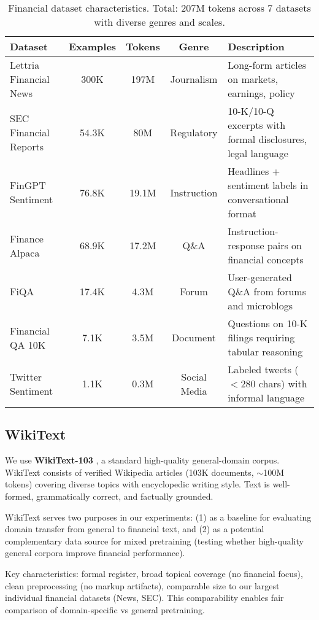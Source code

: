 \begin{table}[h]
\centering
\caption{Financial dataset characteristics. Total: 207M tokens across 7 datasets with diverse genres and scales.}
\label{tab:financial_datasets}
\small
\begin{tabular}{p{3cm}cccp{5.5cm}}
\toprule
\textbf{Dataset} & \textbf{Examples} & \textbf{Tokens} & \textbf{Genre} & \textbf{Description} \\
\midrule
Lettria Financial News & 300K & 197M & Journalism & Long-form articles on markets, earnings, policy \\
\midrule
SEC Financial Reports & 54.3K & 80M & Regulatory & 10-K/10-Q excerpts with formal disclosures, legal language \\
\midrule
FinGPT Sentiment & 76.8K & 19.1M & Instruction & Headlines + sentiment labels in conversational format \\
\midrule
Finance Alpaca & 68.9K & 17.2M & Q\&A & Instruction-response pairs on financial concepts \\
\midrule
FiQA & 17.4K & 4.3M & Forum & User-generated Q\&A from forums and microblogs \\
\midrule
Financial QA 10K & 7.1K & 3.5M & Document & Questions on 10-K filings requiring tabular reasoning \\
\midrule
Twitter Sentiment & 1.1K & 0.3M & Social Media & Labeled tweets ($<$280 chars) with informal language \\
\bottomrule
\end{tabular}
\end{table}

\subsection{WikiText}

We use \textbf{WikiText-103} \parencite{merity2016pointer}, a standard high-quality general-domain corpus. WikiText consists of verified Wikipedia articles (103K documents, $\sim$100M tokens) covering diverse topics with encyclopedic writing style. Text is well-formed, grammatically correct, and factually grounded.

WikiText serves two purposes in our experiments: (1) as a baseline for evaluating domain transfer from general to financial text, and (2) as a potential complementary data source for mixed pretraining (testing whether high-quality general corpora improve financial performance).

Key characteristics: formal register, broad topical coverage (no financial focus), clean preprocessing (no markup artifacts), comparable size to our largest individual financial datasets (News, SEC). This comparability enables fair comparison of domain-specific vs general pretraining.

